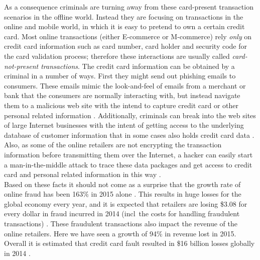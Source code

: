 As a consequence criminals are turning away from these card-present transaction scenarios in the offline world. Instead they are focusing on transactions in the online and mobile world, in which it is easy to pretend to own a certain credit card. Most online transactions (either \gls{E-commerce} or \gls{M-commerce}) rely \emph{only} on credit card information such as card number, card holder and security code for the card validation process; therefore these interactions are usually called \emph{card-not-present transactions}. The credit card information can be obtained by a criminal in a number of ways. First they might send out phishing emails to consumers. These emails mimic the look-and-feel of emails from a merchant or bank that the consumers are normally interacting with, but instead navigate them to a malicious web site with the intend to capture credit card or other personal related information \citep{ConsumerAction2009}. Additionally, criminals can break into the web sites of large Internet businesses with the intent of getting access to the underlying database of customer information that in some cases also holds credit card data \citep{Holmes2015}. Also, as some of the online retailers are not encrypting the transaction information before transmitting them over the Internet, a hacker can easily start a man-in-the-middle attack to trace these data packages and get access to credit card and personal related information in this way \citep{Captain2015}. \\

Based on these facts it should not come as a surprise that the growth rate of online fraud has been 163\% in 2015 alone \citep{PYMNTS2016}. This results in huge losses for the global economy every year, and it is expected that retailers are losing \$3.08 for every dollar in fraud incurred in 2014 (\gls{incl}\ the costs for handling fraudulent transactions) \citep{Rampton2015}. These fraudulent transactions also impact the revenue of the online retailers. Here we have seen a growth of 94\% in revenue lost in 2015. Overall it is estimated that credit card fault resulted in \$16 billion losses globally in 2014 \citep{PYMNTS2016} \citep{BusinessWire2015}. \\

